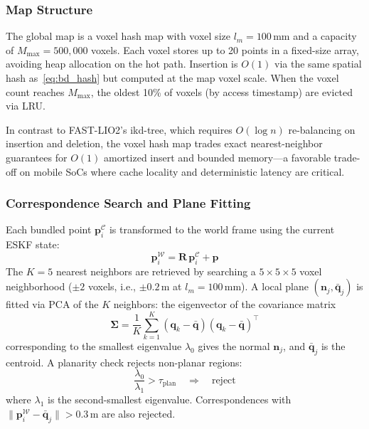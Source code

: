 \subsubsection{Map Structure}
\label{sec:map}

The global map is a voxel hash map with voxel size $l_m = 100$\,mm and a capacity of $M_\text{max} = 500{,}000$ voxels.
Each voxel stores up to 20 points in a fixed-size array, avoiding heap allocation on the hot path.
Insertion is $O(1)$ via the same spatial hash as~\eqref{eq:bd_hash} but computed at the map voxel scale.
When the voxel count reaches $M_\text{max}$, the oldest 10\% of voxels (by access timestamp) are evicted via LRU.

In contrast to FAST-LIO2's ikd-tree, which requires $O(\log n)$ re-balancing on insertion and deletion, the voxel hash map trades exact nearest-neighbor guarantees for $O(1)$ amortized insert and bounded memory---a favorable trade-off on mobile SoCs where cache locality and deterministic latency are critical.

\subsubsection{Correspondence Search and Plane Fitting}
\label{sec:correspondence}

Each bundled point $\mathbf{p}_i^{\mathcal{C}}$ is transformed to the world frame using the current ESKF state:
\begin{equation}
    \mathbf{p}_i^{\mathcal{W}} = \mathbf{R}\,\mathbf{p}_i^{\mathcal{C}} + \mathbf{p}
    \label{eq:body_to_world}
\end{equation}
The $K{=}5$ nearest neighbors are retrieved by searching a $5 \times 5 \times 5$ voxel neighborhood ($\pm 2$ voxels, i.e., $\pm 0.2$\,m at $l_m = 100$\,mm).
A local plane $(\mathbf{n}_j, \bar{\mathbf{q}}_j)$ is fitted via PCA of the $K$ neighbors: the eigenvector of the covariance matrix
\begin{equation}
    \boldsymbol{\Sigma} = \frac{1}{K}\sum_{k=1}^{K}
        (\mathbf{q}_k - \bar{\mathbf{q}})(\mathbf{q}_k - \bar{\mathbf{q}})^\top
    \label{eq:pca_cov}
\end{equation}
corresponding to the smallest eigenvalue $\lambda_0$ gives the normal $\mathbf{n}_j$, and $\bar{\mathbf{q}}_j$ is the centroid.
A planarity check rejects non-planar regions:
\begin{equation}
    \frac{\lambda_0}{\lambda_1} > \tau_\text{plan} \quad\Longrightarrow\quad \text{reject}
    \label{eq:planarity}
\end{equation}
where $\lambda_1$ is the second-smallest eigenvalue.
Correspondences with $\|\mathbf{p}_i^{\mathcal{W}} - \bar{\mathbf{q}}_j\| > 0.3$\,m are also rejected.

